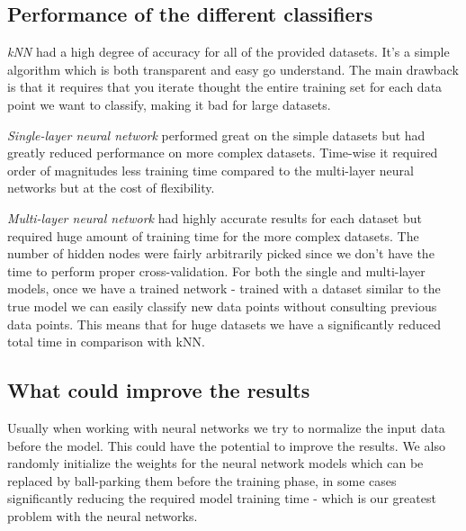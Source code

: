 \documentclass[a4paper,12pt]{article}
\begin{document}
\subsection{Performance of the different classifiers}

\textit{kNN} had a high degree of accuracy for all of the provided datasets. It's a simple algorithm which is both transparent and easy go understand. The main drawback is that it requires that you iterate thought the entire training set for each data point we want to classify, making it bad for large datasets. 

\textit{Single-layer neural network} performed great on the simple datasets but had greatly reduced performance on more complex datasets. Time-wise it required order of magnitudes less training time compared to the multi-layer neural networks but at the cost of flexibility.

\textit{Multi-layer neural network} had highly accurate results for each dataset but required huge amount of training time for the more complex datasets. The number of hidden nodes were fairly arbitrarily picked since we don't have the time to perform proper cross-validation. For both the single and multi-layer models, once we have a trained network - trained with a dataset similar to the true model we can easily classify new data points without consulting previous data points. This means that for huge datasets we have a significantly reduced total time in comparison with kNN.

\subsection{What could improve the results}

Usually when working with neural networks we try to normalize the input data before the model. This could have the potential to improve the results. We also randomly initialize the weights for the neural network models which can be replaced by ball-parking them before the training phase, in some cases significantly reducing the required model training time - which is our greatest problem with the neural networks.
\end{document}
